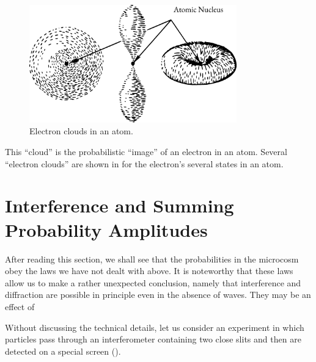 \begin{figure}[!ht]
\centering
\includegraphics[width=0.8\textwidth]{figures/orbitals.pdf}
\caption{ Electron clouds in an atom.\label{orbitals}}
\end{figure}

This ``cloud'' is the probabilistic ``image'' of an electron in an atom.
Several ``electron clouds'' are shown in  for the electron's several states in an atom.

\section{Interference and Summing Probability Amplitudes}

After reading this section, we shall see that the probabilities in the
microcosm obey the laws we have not dealt with above. It is noteworthy
that these laws allow us to make a rather unexpected conclusion,
namely that interference and diffraction are possible in principle even in
the absence of waves. They may be an effect of 

 Without discussing the technical details, let us consider an experiment in which particles pass through an interferometer containing two close slits and
then are detected on a special screen (). 

